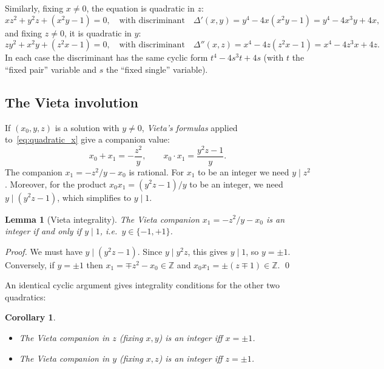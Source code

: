 \documentclass[12pt,a4paper]{article}
\newtheorem{lemma}[theorem]{Lemma}
\newtheorem{corollary}[theorem]{Corollary}
\theoremstyle{definition}
\newcommand{\Z}{\mathbb{Z}}
\begin{document}
Similarly, fixing $x\ne 0$, the equation is quadratic in $z$:
\[
  x z^2 + y^2 z + (x^2 y - 1) = 0,
  \quad\text{with discriminant}\quad
  \Delta'(x,y) = y^4 - 4x(x^2y - 1) = y^4 - 4x^3y + 4x,
\]
and fixing $z\ne 0$, it is quadratic in $y$:
\[
  z y^2 + x^2 y + (z^2 x - 1) = 0,
  \quad\text{with discriminant}\quad
  \Delta''(x,z) = x^4 - 4z(z^2x - 1) = x^4 - 4z^3x + 4z.
\]
In each case the discriminant has the same cyclic form $t^4 - 4s^3t + 4s$
(with $t$ the ``fixed pair'' variable and $s$ the ``fixed single'' variable).

\subsection{The Vieta involution}

If $(x_0, y, z)$ is a solution with $y\ne 0$, \emph{Vieta's formulas}
applied to~\eqref{eq:quadratic_x} give a companion value:
\begin{equation}\label{eq:vieta_sum}
  x_0 + x_1 = -\frac{z^2}{y}, \qquad x_0 \cdot x_1 = \frac{y^2z - 1}{y}.
\end{equation}
The companion $x_1 = -z^2/y - x_0$ is rational.  For $x_1$ to be an
integer we need $y \mid z^2$.  Moreover, for the product $x_0 x_1 =
(y^2z-1)/y$ to be an integer, we need $y \mid (y^2z - 1)$, which
simplifies to $y \mid 1$.

\begin{lemma}[Vieta integrality]\label{lem:vieta_int}
  The Vieta companion $x_1 = -z^2/y - x_0$ is an integer if and only
  if $y \mid 1$, \emph{i.e.}\ $y \in \{-1, +1\}$.
\end{lemma}

\begin{proof}
  We must have $y \mid (y^2z-1)$.  Since $y \mid y^2z$, this gives
  $y \mid 1$, so $y = \pm 1$.  Conversely, if $y = \pm 1$ then $x_1 =
  \mp z^2 - x_0 \in \Z$ and $x_0 x_1 = \pm(z\mp 1)\in\Z$. \qed
\end{proof}

An identical cyclic argument gives integrality conditions for the other
two quadratics:

\begin{corollary}\label{cor:vieta}
  \begin{itemize}[noitemsep]
    \item The Vieta companion in $z$ (fixing $x,y$) is an integer iff $x = \pm 1$.
    \item The Vieta companion in $y$ (fixing $x,z$) is an integer iff $z = \pm 1$.
  \end{itemize}
\end{corollary}
\end{document}
